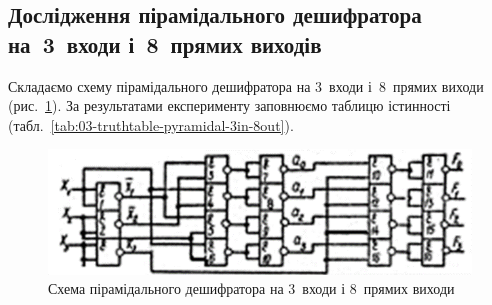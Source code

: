 \documentclass[a4paper,oneside,DIV=12,12pt,headings=normal]{scrartcl}
\begin{document}
			\begin{figure}[!htbp]
			\centering
				\begin{floatrow}
				\end{floatrow}
			\end{figure}
			
		\subsection{Дослідження пірамідального дешифратора на~3~входи і~8~прямих виходів}
			Складаємо схему пірамідального дешифратора на 3~входи і~8~прямих виходи (рис.~\ref{fig:03-schematic-pyramidal-3in-8out}). За результатами експерименту заповнюємо таблицю істинності (табл.~\ref{tab:03-truthtable-pyramidal-3in-8out}).
			
			\begin{figure}[!htbp]
			\centering
				\includegraphics[height = 5\baselineskip]{./assets/03.png}
			\caption{Схема пірамідального дешифратора на 3~входи і 8~прямих виходи}
			\label{fig:03-schematic-pyramidal-3in-8out}
			\end{figure}
			
\end{document}
